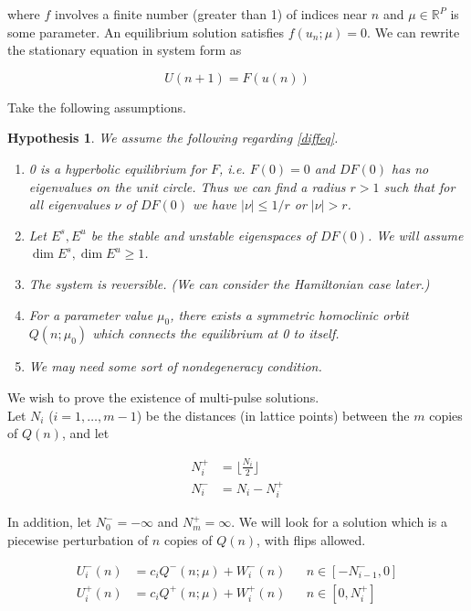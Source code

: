 \documentclass[12pt]{article}
\def\R{{\mathbb R}}
\newtheorem{hypothesis}{Hypothesis}
\begin{document}
where $f$ involves a finite number (greater than 1) of indices near $n$ and $\mu \in \R^P$ is some parameter. An equilibrium solution satisfies $f(u_n; \mu) = 0$. We can rewrite the stationary equation in system form as

\begin{equation}\label{diffeq}
U(n+1) = F(u(n))
\end{equation}

Take the following assumptions.

\begin{hypothesis}\label{initialhyp}
We assume the following regarding \eqref{diffeq}.
\begin{enumerate}[(0)]
\item 0 is a hyperbolic equilibrium for $F$, i.e. $F(0) = 0$ and $DF(0)$ has no eigenvalues on the unit circle. Thus we can find a radius $r > 1$ such that for all eigenvalues $\nu$ of $DF(0)$ we have $|\nu| \leq 1/r$ or $|\nu| > r$.
\item Let $E^s, E^u$ be the stable and unstable eigenspaces of $DF(0)$. We will assume $\dim E^s, \dim E^u \geq 1$.
\item The system is reversible. (We can consider the Hamiltonian case later.)
\item For a parameter value $\mu_0$, there exists a symmetric homoclinic orbit $Q(n; \mu_0)$ which connects the equilibrium at 0 to itself.
\item We may need some sort of nondegeneracy condition.
\end{enumerate}
\end{hypothesis}

We wish to prove the existence of multi-pulse solutions.\\

Let $N_i$ ($i = 1, \dots, m-1$) be the distances (in lattice points) between the $m$ copies of $Q(n)$, and let

\begin{align*}
N_i^+ &= \lfloor \frac{N_i}{2} \rfloor \\
N_i^- &= N_i - N_i^+
\end{align*}

In addition, let $N_0^- = -\infty$ and $N_m^+ = \infty$. We will look for a solution which is a piecewise perturbation of $n$ copies of $Q(n)$, with flips allowed.

\begin{align*}
U_i^-(n) &= c_i Q^-(n; \mu) + W_i^-(n) && n \in [-N_{i-1}^-, 0] \\
U_i^+(n) &= c_i Q^+(n; \mu) + W_i^+(n) && n \in [0, N_i^+]
\end{align*}
\end{document}
